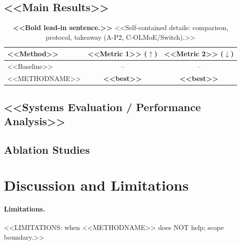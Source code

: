 \documentclass[10pt,letterpaper]{article}
\theoremstyle{plain}
\theoremstyle{definition}
\theoremstyle{remark}
\newcommand{\method}{\textsc{<<METHODNAME>>}\xspace}
\begin{document}
\subsection{<<Main Results>>}
\begin{table}[t] %
  \centering
  \caption{\textbf{<<Bold lead-in sentence.>>} <<Self-contained details:
    comparison, protocol, takeaway (A-P2, C-OLMoE/Switch).>>}
  \label{tab:main} %
  \begin{tabular}{lcc}
    \toprule    %
    <<Method>> & <<Metric 1>> ($\uparrow$) & <<Metric 2>> ($\downarrow$) \\ %
    \midrule    %
    <<Baseline>> & -- & -- \\
    \midrule    %
    \method & \textbf{<<best>>} & \textbf{<<best>>} \\ %
    \bottomrule
  \end{tabular}
\end{table}
\subsection{<<Systems Evaluation / Performance Analysis>>}
\subsection{Ablation Studies}
\label{sec:ablation} %

\section{Discussion and Limitations}
\label{sec:discussion}
\paragraph{Limitations.}
<<LIMITATIONS: when \method does NOT help; scope boundary.>>
\end{document}
